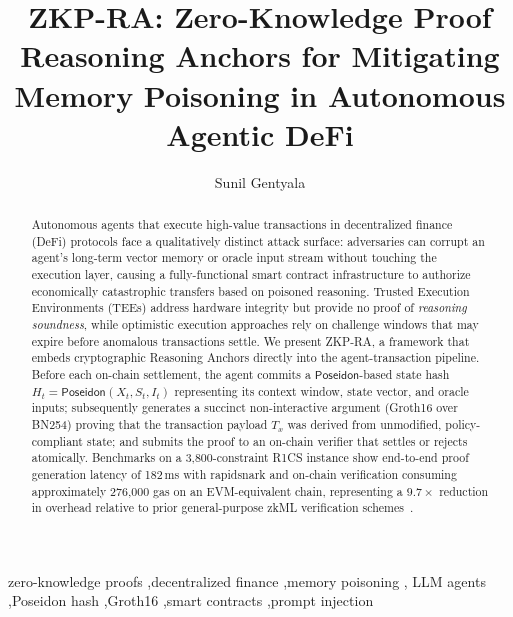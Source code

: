 \documentclass[final,5p,times,twocolumn]{elsarticle}
\theoremstyle{plain}
\theoremstyle{definition}
\theoremstyle{remark}
\newcommand{\poseidon}{\textsf{Poseidon}}
\begin{document}
\begin{frontmatter}

\title{ZKP-RA: Zero-Knowledge Proof Reasoning Anchors for Mitigating\\
       Memory Poisoning in Autonomous Agentic DeFi}

\author[hcl]{Sunil Gentyala}

\address[hcl]{HCL America Inc., Independent Research Division}

\begin{abstract}
Autonomous agents that execute high-value transactions in decentralized finance
(DeFi) protocols face a qualitatively distinct attack surface: adversaries can
corrupt an agent's long-term vector memory or oracle input stream without
touching the execution layer, causing a fully-functional smart contract
infrastructure to authorize economically catastrophic transfers based on
poisoned reasoning. Trusted Execution Environments (TEEs) address hardware
integrity but provide no proof of \emph{reasoning soundness}, while optimistic
execution approaches rely on challenge windows that may expire before anomalous
transactions settle. We present ZKP-RA, a framework that embeds cryptographic
Reasoning Anchors directly into the agent-transaction pipeline. Before each
on-chain settlement, the agent commits a $\poseidon$-based state hash
$H_t = \poseidon(X_t, S_t, I_t)$ representing its context window, state
vector, and oracle inputs; subsequently generates a succinct non-interactive
argument (Groth16 over BN254) proving that the transaction payload $T_x$ was
derived from unmodified, policy-compliant state; and submits the proof to an
on-chain verifier that settles or rejects atomically. Benchmarks on a 3,800-constraint
R1CS instance show end-to-end proof generation latency of 182\,ms with
rapidsnark and on-chain verification consuming approximately 276,000 gas on an
EVM-equivalent chain, representing a $9.7\times$ reduction in overhead relative
to prior general-purpose zkML verification schemes~\cite{chen2024zkml}.
\end{abstract}

\begin{keyword}
zero-knowledge proofs \sep decentralized finance \sep memory poisoning \sep
LLM agents \sep Poseidon hash \sep Groth16 \sep smart contracts \sep prompt injection
\end{keyword}

\end{frontmatter}
\end{document}
